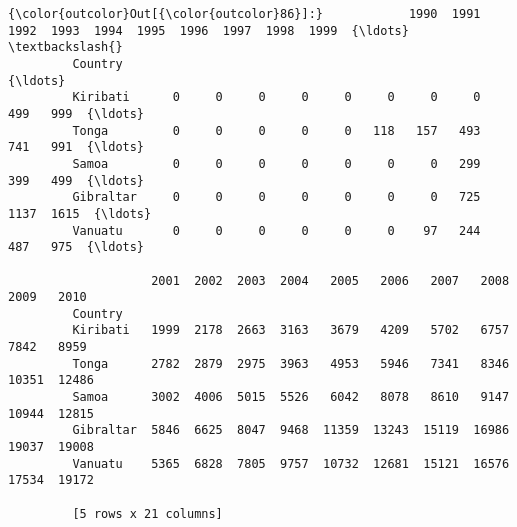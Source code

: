 \documentclass[11pt]{article}
\begin{document}
\begin{Verbatim}[commandchars=\\\{\}]
{\color{outcolor}Out[{\color{outcolor}86}]:}            1990  1991  1992  1993  1994  1995  1996  1997  1998  1999  {\ldots}    \textbackslash{}
         Country                                                                {\ldots}     
         Kiribati      0     0     0     0     0     0     0     0   499   999  {\ldots}     
         Tonga         0     0     0     0     0   118   157   493   741   991  {\ldots}     
         Samoa         0     0     0     0     0     0     0   299   399   499  {\ldots}     
         Gibraltar     0     0     0     0     0     0     0   725  1137  1615  {\ldots}     
         Vanuatu       0     0     0     0     0     0    97   244   487   975  {\ldots}     
         
                    2001  2002  2003  2004   2005   2006   2007   2008   2009   2010  
         Country                                                                      
         Kiribati   1999  2178  2663  3163   3679   4209   5702   6757   7842   8959  
         Tonga      2782  2879  2975  3963   4953   5946   7341   8346  10351  12486  
         Samoa      3002  4006  5015  5526   6042   8078   8610   9147  10944  12815  
         Gibraltar  5846  6625  8047  9468  11359  13243  15119  16986  19037  19008  
         Vanuatu    5365  6828  7805  9757  10732  12681  15121  16576  17534  19172  
         
         [5 rows x 21 columns]
\end{Verbatim}
            
\end{document}
